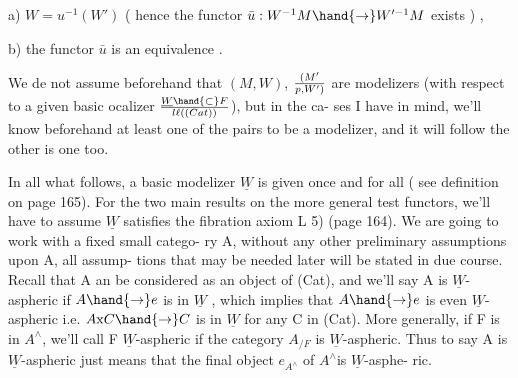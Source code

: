 
a) $W = u^{-1}(W')$ ( hence the functor $\bar{u} : W^{-1}M \hand{\to} W'^{-1}M$ exists ) ,

b) the functor $\bar{u}$ is an equivalence .

We de not assume beforehand that $(M,W)$, $(M'\over{p}{,}W')$ are modelizers
(with respect to a given basic ocalizer $\underline{W} \hand{\subset} F\over{l}{\ell}((Cat))$), but in the ca-%
ses I have in mind, we'll know beforehand at least one of the pairs to
be a modelizer, and it will follow the other is one too.

In all what follows, a basic modelizer $\underline{W}$ is given once and for all
( see definition on page 165). For the two main results on the more
general test functors, we'll have to assume $\underline{W}$ satisfies the fibration
axiom L 5) (page 164). We are going to work with a fixed small catego-%
ry A,  without any other preliminary assumptions upon A, all assump-%
tions that may be needed later will be stated in due course. Recall that
A an be considered as an object of (Cat), and we'll say A is $\underline{W}$-aspheric
if $A \hand{\to} e$ is in $\underline{W}$ , which implies that $A \hand{\to} e$ is even $\underline{W}$-aspheric i.e.
$A\mathrm{x}C \hand{\to} C$ is in $\underline{W}$ for any C in (Cat). More generally, if F is in $A^{\wedge}$,
we'll call F $\underline{W}$-aspheric if the category $A_{/F}$ is $\underline{W}$-aspheric. Thus to
say A is $\underline{W}$-aspheric just means that the final object $e_{A^{\wedge}}$ of $A^{\wedge}$is $\underline{W}$-asphe-%
ric.

